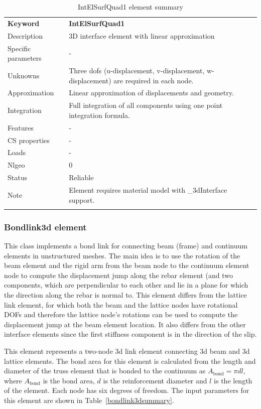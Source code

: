 \documentclass[a4paper]{article}
\newcommand{\param}[1]{\texttt{#1}} %
\newcommand{\templabel}{}%
\newcommand{\tempcaption}{}%
\newcounter{nelpar}
\newenvironment{elementsummary}[5]{%
  \gdef\tempcaption{#4}%
  \gdef\templabel{#5}%
  \setcounter{nelpar}{0}%
  \begin{center} %
    \begin{table}[!htb] %
      \begin{tabular}{|l|p{9cm}|}\hline %
        {\bf Keyword} & \bf{#1}\\ %
        {Description} & {#2}\\ %
        {Specific parameters} & {#3}\\ \hline %
}{
  \\ \hline %
      \end{tabular}%
      \caption{\tempcaption}%
      \label{\templabel}%
    \end{table}%
  \end{center}%
}
\newcommand{\elementParam}[1]{%
  \ifthenelse{\value{nelpar}>0} %
             {&{#1}}%
             {\setcounter{nelpar}{1}Parameters&{#1}}%
             \\%
}
\newcommand{\elementDescription}[2]{{#1} & {#2}\\}
\begin{document}
\begin{elementsummary}{IntElSurfQuad1}{3D  interface element with linear approximation}{-}{IntElSurfQuad1 element summary}{Interface3dquadlinsummary}
\elementDescription{Unknowns}{Three dofs (u-displacement, v-displacement, w-displacement) are required in each node.}
\elementDescription{Approximation}{Linear approximation of displacements and geometry.}
\elementDescription{Integration}{Full integration of all components using one point integration formula.}
\elementDescription{Features}{-}
\elementDescription{CS properties}{-}
\elementDescription{Loads}{-}
\elementDescription{Nlgeo}{0}
\elementDescription{Status}{Reliable}
\elementDescription{Note}{Element requires material model with \_3dInterface support.}
\end{elementsummary}


\subsubsection{Bondlink3d element}
This class implements a bond link for connecting beam (frame) and continuum elements in unstructured meshes.
The main idea is to use the rotation of the beam element and the rigid arm from the beam node to the continuum element node to compute the displacement jump along the rebar element (and two components, which are perpendicular to each other and lie in a plane for which the direction along the rebar is normal to. This element differs from the lattice link element, for which both the beam and the lattice nodes have rotational DOFs and therefore the lattice node's rotations can be used to compute the displacement jump at the beam element location. It also differs from the other interface elements since the first stiffness component is in the direction of the slip.     

This element represents a two-node 3d link element connecting 3d beam and 3d lattice elements.
The bond area for this element is calculated from the length and diameter of the truss element that is bonded to the continuum as $A_{\mathrm{bond}} = \pi d l$, where $A_{\mathrm{bond}}$ is the bond area, $d$ is the reinforcement diameter and $l$ is the length of the element. Each node has six degrees of freedom. 
The input parameters for this element are shown in Table~\ref{bondlink3dsummary}. 
\end{document}
